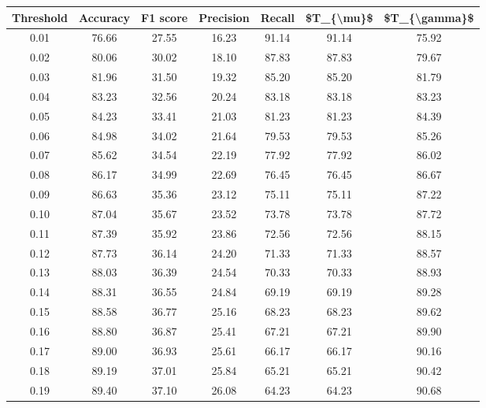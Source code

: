 \begin{tabular}{|c|c|c|c|c|c|c|}
\hline
 Threshold &  Accuracy &  F1 score &  Precision &  Recall &  \$T\_\{\textbackslash mu\}\$ &  \$T\_\{\textbackslash gamma\}\$ \\
\hline
      0.01 &     76.66 &     27.55 &      16.23 &   91.14 &      91.14 &         75.92 \\
      0.02 &     80.06 &     30.02 &      18.10 &   87.83 &      87.83 &         79.67 \\
      0.03 &     81.96 &     31.50 &      19.32 &   85.20 &      85.20 &         81.79 \\
      0.04 &     83.23 &     32.56 &      20.24 &   83.18 &      83.18 &         83.23 \\
      0.05 &     84.23 &     33.41 &      21.03 &   81.23 &      81.23 &         84.39 \\
      0.06 &     84.98 &     34.02 &      21.64 &   79.53 &      79.53 &         85.26 \\
      0.07 &     85.62 &     34.54 &      22.19 &   77.92 &      77.92 &         86.02 \\
      0.08 &     86.17 &     34.99 &      22.69 &   76.45 &      76.45 &         86.67 \\
      0.09 &     86.63 &     35.36 &      23.12 &   75.11 &      75.11 &         87.22 \\
      0.10 &     87.04 &     35.67 &      23.52 &   73.78 &      73.78 &         87.72 \\
      0.11 &     87.39 &     35.92 &      23.86 &   72.56 &      72.56 &         88.15 \\
      0.12 &     87.73 &     36.14 &      24.20 &   71.33 &      71.33 &         88.57 \\
      0.13 &     88.03 &     36.39 &      24.54 &   70.33 &      70.33 &         88.93 \\
      0.14 &     88.31 &     36.55 &      24.84 &   69.19 &      69.19 &         89.28 \\
      0.15 &     88.58 &     36.77 &      25.16 &   68.23 &      68.23 &         89.62 \\
      0.16 &     88.80 &     36.87 &      25.41 &   67.21 &      67.21 &         89.90 \\
      0.17 &     89.00 &     36.93 &      25.61 &   66.17 &      66.17 &         90.16 \\
      0.18 &     89.19 &     37.01 &      25.84 &   65.21 &      65.21 &         90.42 \\
      0.19 &     89.40 &     37.10 &      26.08 &   64.23 &      64.23 &         90.68 \\

\end{tabular}
